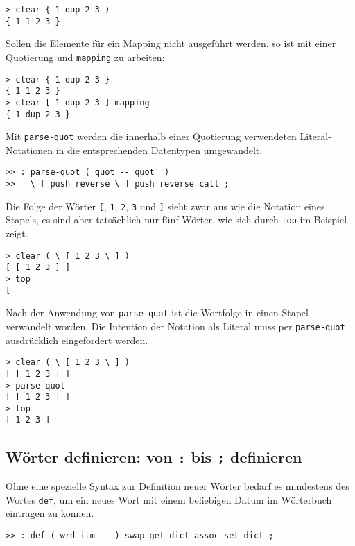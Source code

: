 \begin{verbatim}
> clear { 1 dup 2 3 )
{ 1 1 2 3 }
\end{verbatim}

Sollen die Elemente für ein Mapping nicht ausgeführt werden, so ist mit einer Quotierung und \verb|mapping| zu arbeiten:

\begin{verbatim}
> clear { 1 dup 2 3 }
{ 1 1 2 3 }
> clear [ 1 dup 2 3 ] mapping
{ 1 dup 2 3 }
\end{verbatim}

Mit \verb|parse-quot| werden die innerhalb einer Quotierung verwendeten Li\-te\-ral-Notationen in die entsprechenden Datentypen umgewandelt. 

\begin{verbatim}  
>> : parse-quot ( quot -- quot' )
>>   \ [ push reverse \ ] push reverse call ;
\end{verbatim}

Die Folge der Wörter \verb|[|, \verb|1|, \verb|2|, \verb|3| und \verb|]| sieht zwar aus wie die Notation eines Stapels, es sind aber tatsächlich nur fünf Wörter, wie sich durch \verb|top| im Beispiel zeigt.

\begin{verbatim}
> clear ( \ [ 1 2 3 \ ] )
[ [ 1 2 3 ] ]
> top
[
\end{verbatim}

Nach der Anwendung von \verb|parse-quot| ist die Wortfolge in einen Stapel verwandelt worden. Die Intention der Notation als Literal muss per \verb|parse-quot| ausdrücklich eingefordert werden.

\begin{verbatim}
> clear ( \ [ 1 2 3 \ ] )
[ [ 1 2 3 ] ]
> parse-quot
[ [ 1 2 3 ] ]
> top
[ 1 2 3 ]
\end{verbatim}

\subsection{Wörter definieren: von \texttt{:} bis \texttt{;} definieren}
\label{Sec:DefWords}

Ohne eine spezielle Syntax zur Definition neuer Wörter bedarf es mindestens des Wortes \verb|def|, um ein neues Wort mit einem beliebigen Datum im Wörterbuch eintragen zu können.

\begin{verbatim}
>> : def ( wrd itm -- ) swap get-dict assoc set-dict ;
\end{verbatim} 

